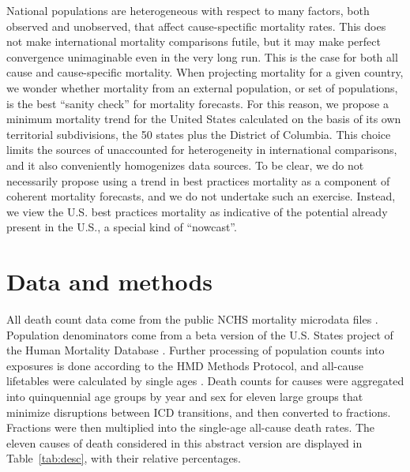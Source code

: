 \documentclass[11pt,oneside,a4paper]{article} %
\begin{document}
National populations are heterogeneous with respect to many factors, both
observed and unobserved, that affect cause-spectific mortality rates. This does
not make international mortality comparisons futile, but it may make perfect
convergence unimaginable even in the very long run. This is the case for both
all cause and cause-specific mortality. When projecting mortality for a given country, we wonder whether mortality from an external population, or set of populations, is the best ``sanity
check'' for mortality forecasts.
For this reason, we propose a minimum mortality trend for the United States
calculated on the basis of its own territorial subdivisions, the 50 states plus
the District of Columbia. This choice limits the sources of unaccounted for
heterogeneity in international comparisons, and it also conveniently homogenizes
data sources. To be clear, we do not necessarily propose using a trend in best
practices mortality as a component of coherent mortality forecasts, and we do
not undertake such an exercise. Instead, we view the U.S. best practices
mortality as indicative of the potential already present in the U.S., a special
kind of ``nowcast''.

\section*{Data and methods}
All death count data come from the public NCHS mortality microdata files
\citep{NCHSdata}. Population denominators come from a beta version of the U.S.
States project of the Human Mortality Database \citep{HMD}. Further processing of
population counts into exposures is done according to the HMD Methods
Protocol, and all-cause lifetables were calculated by single ages \citep{HMDMP}.
Death counts for causes were aggregated into quinquennial age groups by year and sex for eleven large groups that minimize disruptions between ICD transitions, and then
converted to fractions. Fractions were then multiplied into the single-age
all-cause death rates. The eleven causes of death considered in this abstract
version are displayed in Table~\ref{tab:desc}, with their relative percentages.
\end{document}
